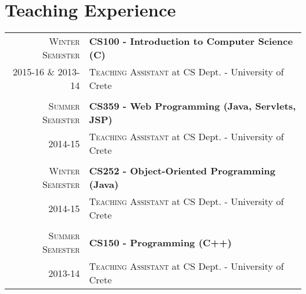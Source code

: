 \documentclass[11pt]{article}
\begin{document}
\section{Teaching Experience}
\begin{longtable}{r|p{12.5cm}}
\textsc{Winter Semester} & \textbf{CS100 - Introduction to Computer Science (C)}  \\
\textsc{2015-16 \& 2013-14} &\textsc{Teaching Assistant} at CS Dept. - University of Crete\\

\multicolumn{2}{c}{} \\
\textsc{Summer Semester} & \textbf{CS359 - Web Programming (Java, Servlets, JSP)}  \\
\textsc{2014-15} &\textsc{Teaching Assistant} at CS Dept. - University of Crete\\


\multicolumn{2}{c}{} \\
\textsc{Winter Semester} & \textbf{CS252 - Object-Oriented Programming (Java)}  \\
\textsc{2014-15} &\textsc{Teaching Assistant} at CS Dept. - University of Crete\\


\multicolumn{2}{c}{} \\
\textsc{Summer Semester} & \textbf{CS150 - Programming (C++)}  \\
\textsc{2013-14} &\textsc{Teaching Assistant} at CS Dept. - University of Crete\\

\end{longtable}

\end{document}
